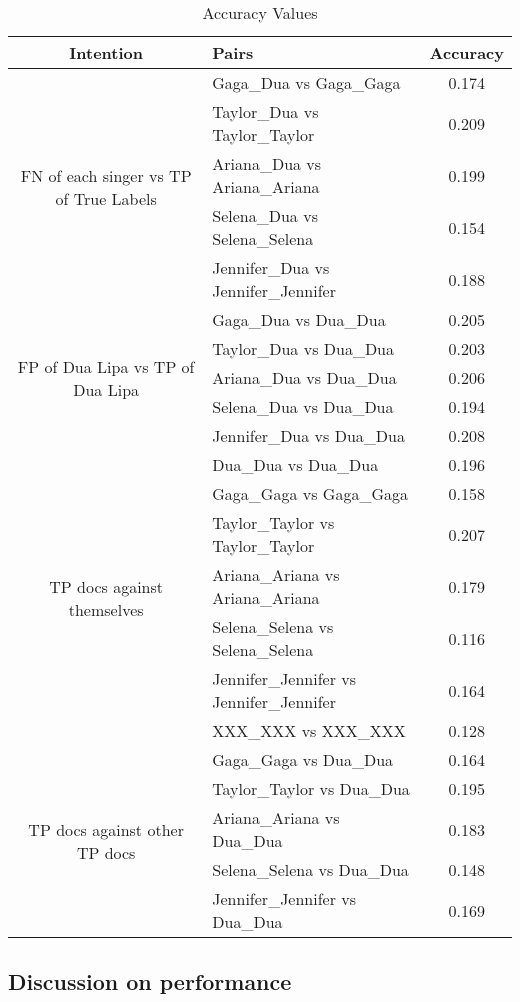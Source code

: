 \documentclass[a4paper,11pt]{article}
\begin{document}
\begin{table}[htbp]
\centering
\caption{Accuracy Values}
\small
\begin{tabular}{|c|l|c|}
\hline
\textbf{Intention} & \textbf{Pairs} & \textbf{Accuracy} \\ \hline
\multirow{5}{*}{FN of each singer vs TP of True Labels} & Gaga\_Dua vs Gaga\_Gaga & 0.174 \\
& Taylor\_Dua vs Taylor\_Taylor & 0.209 \\
& Ariana\_Dua vs Ariana\_Ariana & 0.199 \\
& Selena\_Dua vs Selena\_Selena & 0.154 \\
& Jennifer\_Dua vs Jennifer\_Jennifer & 0.188 \\
\hline
\multirow{5}{*}{FP of Dua Lipa vs TP of Dua Lipa} & Gaga\_Dua vs Dua\_Dua & 0.205 \\
& Taylor\_Dua vs Dua\_Dua & 0.203 \\
& Ariana\_Dua vs Dua\_Dua & 0.206 \\
& Selena\_Dua vs Dua\_Dua & 0.194 \\
& Jennifer\_Dua vs Dua\_Dua & 0.208 \\
\hline
\multirow{7}{*}{TP docs against themselves} & Dua\_Dua vs Dua\_Dua & 0.196 \\
& Gaga\_Gaga vs Gaga\_Gaga & 0.158 \\
& Taylor\_Taylor vs Taylor\_Taylor & 0.207 \\
& Ariana\_Ariana vs Ariana\_Ariana & 0.179 \\
& Selena\_Selena vs Selena\_Selena & 0.116 \\
& Jennifer\_Jennifer vs Jennifer\_Jennifer & 0.164 \\
& XXX\_XXX vs XXX\_XXX & 0.128 \\
\hline
\multirow{5}{*}{TP docs against other TP docs} & Gaga\_Gaga vs Dua\_Dua & 0.164 \\
& Taylor\_Taylor vs Dua\_Dua & 0.195 \\
& Ariana\_Ariana vs Dua\_Dua & 0.183 \\
& Selena\_Selena vs Dua\_Dua & 0.148 \\
& Jennifer\_Jennifer vs Dua\_Dua & 0.169 \\
\hline
\end{tabular}
\label{tab:accuracy}
\end{table}







\subsection{Discussion on performance}
\end{document}
